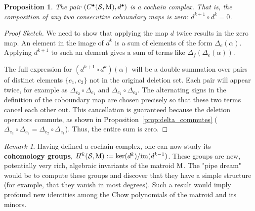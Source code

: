 \documentclass[11pt]{article}
\newcommand{\calS}{\mathcal{S}}
\newcommand{\M}{\normalfont\text{M}}
\newtheorem{proposition}[theorem]{Proposition}
\theoremstyle{remark}
\newtheorem*{remark}{Remark} %
\begin{document}
\begin{proposition}
    The pair \((C^\bullet(\calS, \M), d^\bullet)\) is a cochain complex. That is, the composition of any two consecutive coboundary maps is zero: \(d^{k+1} \circ d^k = 0\).
\end{proposition}
\begin{proof}[Proof Sketch]
    We need to show that applying the map \(d\) twice results in the zero map. An element in the image of \(d^k\) is a sum of elements of the form \(\Delta_e(\alpha)\). Applying \(d^{k+1}\) to such an element gives a sum of terms like \(\Delta_f(\Delta_e(\alpha))\).

    The full expression for \((d^{k+1} \circ d^k)(\alpha)\) will be a double summation over pairs of distinct elements \(\{e_1, e_2\}\) not in the original deletion set. Each pair will appear twice, for example as \(\Delta_{e_2} \circ \Delta_{e_1}\) and \(\Delta_{e_1} \circ \Delta_{e_2}\). The alternating signs in the definition of the coboundary map are chosen precisely so that these two terms cancel each other out. This cancellation is guaranteed because the deletion operators commute, as shown in Proposition~\ref{prop:delta_commutes} (\(\Delta_{e_1} \circ \Delta_{e_2} = \Delta_{e_2} \circ \Delta_{e_1}\)). Thus, the entire sum is zero.
\end{proof}

\begin{remark}
    Having defined a cochain complex, one can now study its \textbf{cohomology groups}, \(H^k(\calS, \M) := \ker(d^k) / \text{im}(d^{k-1})\). These groups are new, potentially very rich, algebraic invariants of the matroid \(\M\). The "pipe dream" would be to compute these groups and discover that they have a simple structure (for example, that they vanish in most degrees). Such a result would imply profound new identities among the Chow polynomials of the matroid and its minors.
\end{remark}
\end{document}
